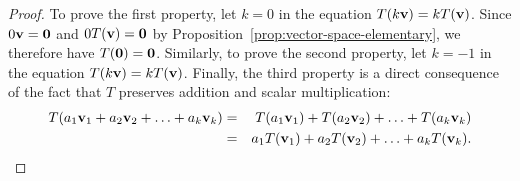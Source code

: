 \begin{proof}
  To prove the first property, let $k=0$ in the equation
  $T(k\vect{v}) = kT(\vect{v})$. Since $0\vect{v}=\vect{0}$ and
  $0T(\vect{v})=\vect{0}$ by
  Proposition~\ref{prop:vector-space-elementary}, we therefore have
  $T(\vect{0}) = \vect{0}$.  Similarly, to prove the second property,
  let $k=-1$ in the equation $T(k\vect{v}) = kT(\vect{v})$.
  Finally, the third property is a direct consequence of the fact that
  $T$ preserves addition and scalar multiplication:
  \begin{eqnarray*}
    T(a_1\vect{v}_1 + a_2\vect{v}_2 + \ldots + a_k\vect{v}_k)
    &=& T(a_1\vect{v}_1) + T(a_2\vect{v}_2) + \ldots + T(a_k\vect{v}_k) \\
    &=& a_1T(\vect{v}_1) + a_2T(\vect{v}_2) + \ldots + a_kT(\vect{v}_k).
  \end{eqnarray*}
\end{proof}

